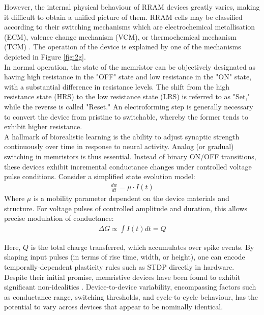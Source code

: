 \noindent However, the internal physical behaviour of RRAM devices greatly varies, making it difficult to obtain a unified picture of them. RRAM cells may be classified according to their switching mechanisms which are electrochemical metallisation (ECM), valence change mechanism (VCM), or thermochemical mechanism (TCM) \cite{goux2016electrochemical}. The operation of the device is explained by one of the mechanisms depicted in Figure \ref{fig:2g}. \\

\noindent In normal operation, the state of the memristor can be objectively designated as having high resistance in the "OFF" state and low resistance in the "ON" state, with a substantial difference in resistance levels. The shift from the high resistance state (HRS) to the low resistance state (LRS) is referred to as "Set," while the reverse is called "Reset." An electroforming step is generally necessary to convert the device from pristine to switchable, whereby the former tends to exhibit higher resistance. \\

\noindent A hallmark of biorealistic learning is the ability to adjust synaptic strength continuously over time in response to neural activity. Analog (or gradual) switching in memristors is thus essential. Instead of binary ON/OFF transitions, these devices exhibit incremental conductance changes under controlled voltage pulse conditions. Consider a simplified state evolution model:
\begin{align}
    \frac{dw}{dt} = \mu \cdot I(t) \label{eq:2.25}
\end{align}
Where $\mu$ is a mobility parameter dependent on the device materials and structure. For voltage pulses of controlled amplitude and duration, this allows precise modulation of conductance:
\begin{align}
    \Delta G \varpropto \int I(t) dt = Q \label{eq:2.26}
\end{align}

\noindent Here, $Q$ is the total charge transferred, which accumulates over spike events. By shaping input pulses (in terms of rise time, width, or height), one can encode temporally-dependent plasticity rules such as STDP directly in hardware.\\

\noindent Despite their initial promise, memristive devices have been found to exhibit significant non-idealities \cite{govoreanu2013vacancy}. Device-to-device variability, encompassing factors such as conductance range, switching thresholds, and cycle-to-cycle behaviour, has the potential to vary across devices that appear to be nominally identical.\\


